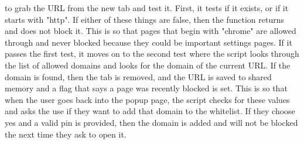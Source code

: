 \documentclass[12pt]{article}
\begin{document}
to grab the URL from the new tab and test it. First, it tests if it exists, or if it starts with "http". If either of these things are false, then the function returns and does not block it. 
This is so that pages that begin with "chrome" are allowed through and never blocked because they could be important settings pages. 
If it passes the first test, it moves on to the second test where the script looks through the list of allowed domains and looks for the domain of the current URL. If the domain is found, then the tab is removed, and the URL is saved to shared memory and a flag that says a page was recently blocked is set. 
This is so that when the user goes back into the popup page, the script checks for these values and asks the use if they want to add that domain to the whitelist. If they choose yes and a valid pin is provided, then the domain 
is added and will not be blocked the next time they ask to open it.
\\\\
\end{document}
